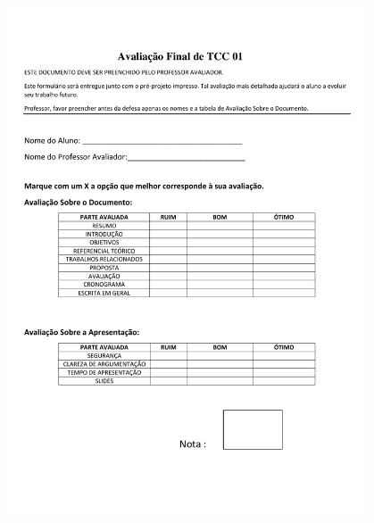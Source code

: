 \documentclass[
	article,			%
	11pt,				%
	oneside,			%
	a4paper,			%
	english,			%
	brazil,				%
	sumario=tradicional
	]{abntex2}
\begin{document}
\begin{figure} [!hbt] 
\centering
	\includegraphics[width=0.95\textwidth]{formulario}
\end{figure}
\end{document}
